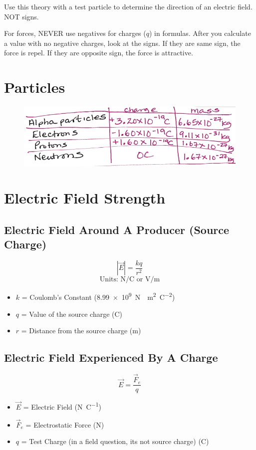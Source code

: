 \documentclass[a4paper,12pt]{article}
\begin{document}
Use this theory with a test particle to determine the direction of an electric field. NOT signs.

For forces, NEVER use negatives for charges ($q$) in formulas. After you calculate a value with no negative charges, look at the signs. If they are same sign, the force is repel. If they are opposite sign, the force is attractive.

\section{Particles}
\begin{figure}[H]
    \centering
    \includegraphics[width=\textwidth]{particles}
\end{figure}

\section{Electric Field Strength}
\subsection{Electric Field Around A Producer (Source Charge)}
\Large $$|\vec{E}| = \frac{kq}{r^2}$$ \normalsize
$$\textrm{Units: } \si{\newton\per\coulomb} \textrm{ or } \si{\V\per\m}$$
\begin{itemize}
    \item{$k$ = Coulomb's Constant (\SI{8.99e9}{\newton\cdot\m\squared\per\coulomb\squared})}
    \item{$q$ = Value of the source charge (\si{\coulomb})}
    \item{$r$ = Distance from the source charge (\si{\m})}
\end{itemize}

\subsection{Electric Field Experienced By A Charge}
\Large $$\vec{E} = \frac{\vec{F}_e}{q}$$ \normalsize
\begin{itemize}
    \item{$\vec{E}$ = Electric Field (\si{\newton\per\coulomb})}
    \item{$\vec{F}_e$ = Electrostatic Force (\si{\newton})}
    \item{$q$ = Test Charge (in a field question, its not source charge) (\si{\coulomb})}
\end{itemize}
\end{document}
